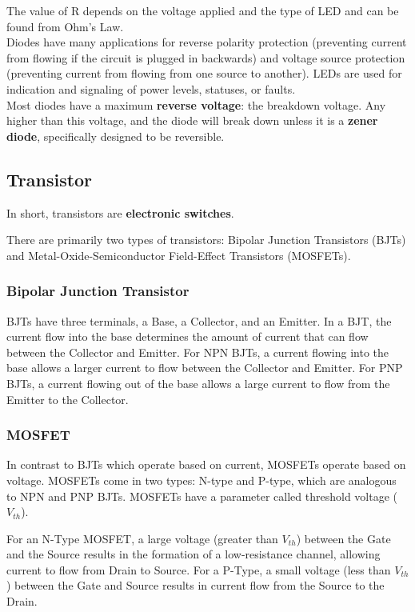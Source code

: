 \documentclass{article}
\begin{document}
The value of R depends on the voltage applied and the type of LED and can be found from Ohm’s Law. \\

Diodes have many applications for reverse polarity protection (preventing current from flowing if the circuit is plugged in backwards) and voltage source protection (preventing current from flowing from one source to another). LEDs are used for indication and signaling of power levels, statuses, or faults. \\

Most diodes have a maximum \textbf{reverse voltage}: the breakdown voltage. Any higher than this voltage, and the diode will break down unless it is a \textbf{zener diode}, specifically designed to be reversible.


\subsection{Transistor}

In short, transistors are \textbf{electronic switches}.

There are primarily two types of transistors: Bipolar Junction Transistors (BJTs) and Metal-Oxide-Semiconductor Field-Effect Transistors (MOSFETs). 
\subsubsection{Bipolar Junction Transistor}

BJTs have three terminals, a Base, a Collector, and an Emitter. In a BJT, the current flow into the base determines
the amount of current that can flow between the Collector and Emitter. For NPN BJTs, a current flowing into the base allows a larger current
to flow between the Collector and Emitter. For PNP BJTs, a current flowing out of the base allows a large current to flow from the Emitter to the
Collector.

\subsubsection{MOSFET}
In contrast to BJTs which operate based on current, MOSFETs operate based on voltage. MOSFETs come in two types: N-type and P-type, which are analogous
to NPN and PNP BJTs. MOSFETs have a parameter called threshold voltage ($V_{th}$). 

For an N-Type MOSFET, a large voltage (greater than $V_{th}$) between the Gate and the Source results in the formation of a low-resistance channel, allowing
current to flow from Drain to Source. For a P-Type, a small voltage (less than $V_{th}$) between the Gate and Source results in current flow from the Source
to the Drain.
\end{document}
